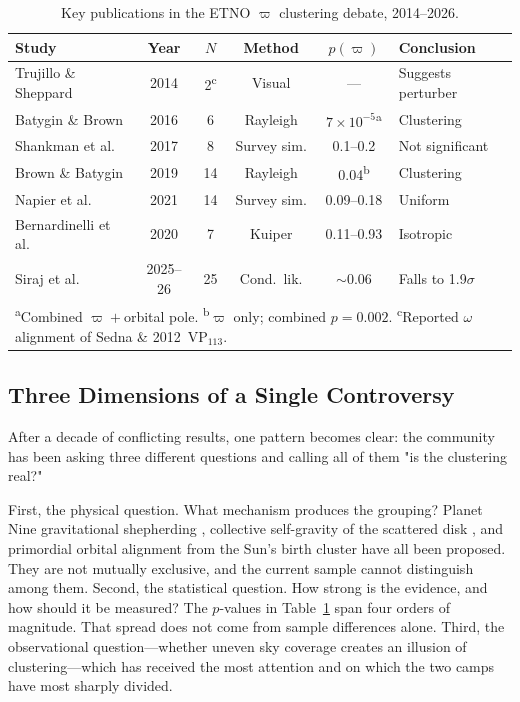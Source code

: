 \documentclass[usenatbib]{mnras}
\begin{document}
\begin{table}[h]
\centering
\caption{Key publications in the ETNO $\varpi$ clustering debate, 2014--2026.}
\label{tab:timeline}
\footnotesize
\begin{tabular}{p{2.8cm}ccccp{2.8cm}}
\hline
Study & Year & $N$ & Method & $p(\varpi)$ & Conclusion \\
\hline
Trujillo \& Sheppard \cite{trujillo2014} & 2014 & 2\textsuperscript{c} & Visual & --- & Suggests perturber \\
Batygin \& Brown \cite{batygin2016} & 2016 & 6 & Rayleigh & $7{\times}10^{-5}$\textsuperscript{a} & Clustering \\
Shankman et al.\ \cite{shankman2017} & 2017 & 8 & Survey sim. & 0.1--0.2 & Not significant \\
Brown \& Batygin \cite{brown2019} & 2019 & 14 & Rayleigh & 0.04\textsuperscript{b} & Clustering \\
Napier et al.\ \cite{napier2021} & 2021 & 14 & Survey sim. & 0.09--0.18 & Uniform \\
Bernardinelli et al.\ \cite{bernardinelli2020} & 2020 & 7 & Kuiper & 0.11--0.93 & Isotropic \\
Siraj et al.\ \cite{siraj2025,siraj2026} & 2025--26 & 25 & Cond.\ lik. & $\sim$0.06 & Falls to 1.9$\sigma$ \\
\hline
\multicolumn{6}{l}{\footnotesize\textsuperscript{a}Combined $\varpi{+}$orbital pole. \textsuperscript{b}$\varpi$ only; combined $p{=}0.002$. \textsuperscript{c}Reported $\omega$ alignment of Sedna \& 2012~VP$_{113}$.} \\
\end{tabular}
\end{table}

\subsection{Three Dimensions of a Single Controversy}

After a decade of conflicting results, one pattern becomes clear: the community has been asking three different questions and calling all of them "is the clustering real?"

First, the physical question. What mechanism produces the grouping? Planet Nine gravitational shepherding \cite{batygin2016,brown2019}, collective self-gravity of the scattered disk \cite{madigan2018,zderic2020}, and primordial orbital alignment from the Sun's birth cluster \cite{trujillo2014} have all been proposed. They are not mutually exclusive, and the current sample cannot distinguish among them. Second, the statistical question. How strong is the evidence, and how should it be measured? The $p$-values in Table~\ref{tab:timeline} span four orders of magnitude. That spread does not come from sample differences alone. Third, the observational question---whether uneven sky coverage creates an illusion of clustering---which has received the most attention and on which the two camps have most sharply divided.
\end{document}
